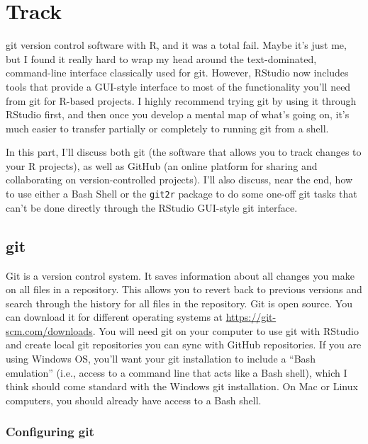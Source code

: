\documentclass[]{tufte-book}
\begin{document}
\hypertarget{track}{%
\chapter{Track}\label{track}}

 git version control software with R, and
it was a total fail. Maybe it's just me, but I found it really hard to wrap my head around
the text-dominated, command-line interface classically used for git. However, RStudio now
includes tools that provide a GUI-style
interface to most of the functionality you'll need from git for R-based projects. I highly
recommend trying git by using it through RStudio first, and then once you develop a mental
map of what's going on, it's much easier to transfer partially or completely to running git
from a shell.

In this part, I'll discuss both git (the software that allows you to track changes to your
R projects), as well as GitHub (an online platform for sharing and collaborating on
version-controlled projects). I'll also discuss, near the end, how to use either a Bash
Shell or the \texttt{git2r} package to do some one-off git tasks that can't be done directly through
the RStudio GUI-style git interface.

\hypertarget{git}{%
\section{git}\label{git}}

Git is a version control system. It saves information about all changes you make
on all files in a repository. This allows you to revert back to previous
versions and search through the history for all files in the repository. Git is
open source. You can download it for different operating systems at
\url{https://git-scm.com/downloads}. You will need git on your computer to use git
with RStudio and create local git repositories you can sync with GitHub
repositories. If you are using Windows OS, you'll want your git installation to
include a ``Bash emulation'' (i.e., access to a command line that acts like a Bash
shell), which I think should come standard with the Windows git installation.
On Mac or Linux computers, you should already have access to a Bash shell.

\hypertarget{configuring-git}{%
\subsection{Configuring git}\label{configuring-git}}
\end{document}
